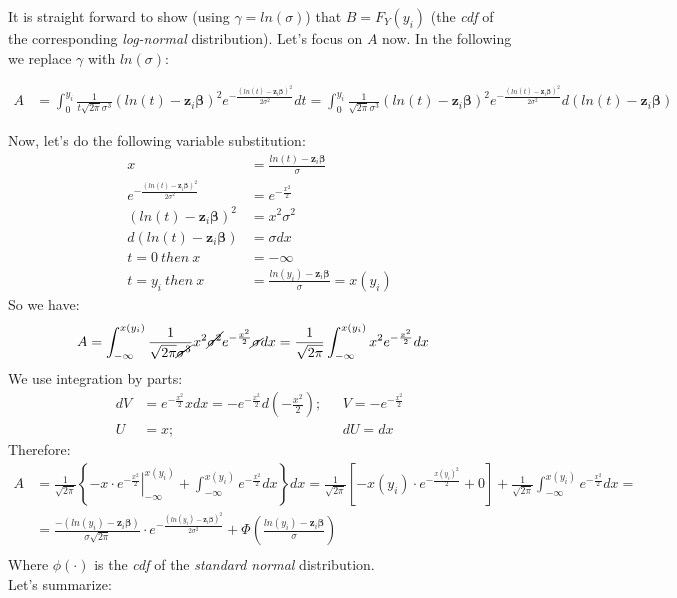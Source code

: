 \documentclass[]{article}
\begin{document}
It is straight forward to show (using $\gamma = ln(\sigma)$) that $B = F_Y(y_i)$ (the \emph{cdf} of the corresponding \emph{log-normal} distribution). Let's focus on $A$ now. In the following we replace $\gamma$ with $ln(\sigma)$:

  $$
  \begin{aligned}
    A &=   \int_0^{y_i}   \frac{1}{t \sqrt{2 \pi } \sigma^3}  \left(  ln(t) -  \pmb{z}_i\pmb{\beta}  \right)^2 e^{-\frac{(ln(t) - \pmb{z}_i\pmb{\beta})^2}{2\sigma^2}} dt  = 
    \int_0^{y_i}   \frac{1}{\sqrt{2 \pi } \sigma^3}  \left(  ln(t) -  \pmb{z}_i\pmb{\beta}  \right)^2 e^{-\frac{(ln(t) - \pmb{z}_i\pmb{\beta})^2}{2\sigma^2}} d(ln(t) - \pmb{z}_i\pmb{\beta})
  \end{aligned}
  $$

Now, let's do the following variable substitution:
  $$
  \begin{aligned}
    x &=  \frac{ln(t) - \pmb{z}_i\pmb{\beta}}{\sigma}\\
    e^{-\frac{(ln(t) - \pmb{z}_i\pmb{\beta})^2}{2\sigma^2}}   &=   e^{-\frac{x^2}{2}}\\
    \left(  ln(t) -  \pmb{z}_i\pmb{\beta}  \right)^2   &=  x^2 \sigma^2\\
    d(ln(t) - \pmb{z}_i\pmb{\beta}) &= \sigma dx\\
    t=0~then~x &= -\infty\\
    t = y_i ~then~x  &=\frac{ln(y_i) - \pmb{z}_i\pmb{\beta}}{\sigma} = x(y_i)
  \end{aligned}
  $$
So we have:
  $$
  \begin{aligned}
    A &=   \int_{-\infty}^{x(y_i)}   \frac{1}{ \sqrt{2 \pi } \cancel{\sigma^3}}   x^2 \cancel{\sigma^2} e^{-\frac{x^2}{2}} \cancel{\sigma} dx  =  \frac{1}{ \sqrt{2 \pi } }  \int_{-\infty}^{x(y_i)}     x^2  e^{-\frac{x^2}{2}} dx
  \end{aligned}
  $$
We use integration by parts:
  $$
  \begin{aligned}
    dV &= e^{-\frac{x^2}{2}} x dx = -e^{-\frac{x^2}{2}} d\left(-\frac{x^2}{2}\right);~~~ &V = - e^{-\frac{x^2}{2}}\\
    U &= x;~~~ &dU = dx
  \end{aligned}
  $$
Therefore:
  $$
  \begin{aligned}
    A & =  \frac{1}{ \sqrt{2 \pi } }      \left\{    \left.-x\cdot e^{-\frac{x^2}{2}}\right|_{-\infty}^{x(y_i)}  + \int_{-\infty}^{x(y_i)} e^{-\frac{x^2}{2}} dx   \right\}      dx =  \frac{1}{ \sqrt{2 \pi } }   \left[-x(y_i)\cdot e^{-\frac{x(y_i)^2}{2}}  + 0  \right]  +  \frac{1}{ \sqrt{2 \pi } }  \int_{-\infty}^{x(y_i)} e^{-\frac{x^2}{2}} dx  =\\
    & =  \frac{-(ln(y_i) - \pmb{z}_i\pmb{\beta})}{ \sigma\sqrt{2 \pi } }  \cdot e^{-\frac{(ln(y_i) - \pmb{z}_i\pmb{\beta})^2}{2\sigma^2}}   +  \Phi\left(  \frac{ln(y_i) - \pmb{z}_i\pmb{\beta}}{\sigma}  \right)\\
  \end{aligned}
  $$
Where $\phi(\cdot)$ is the \emph{cdf} of the \emph{standard normal} distribution.\\
Let's summarize:
\end{document}
